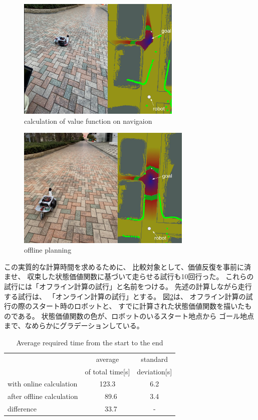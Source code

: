 \documentclass{jarticle}
\begin{document}
\begin{figure}[htb]
  \centering
   \includegraphics[height=58mm]{./figs/raspicat-online.png}
   \caption{calculation of value function on navigaion}
	\label{fig:raspicat-no-local}
\end{figure}

\begin{figure}[b]
  \centering
   \includegraphics[height=58mm]{./figs/raspicat-offline.png}
   \caption{offline planning}
	\label{fig:raspicat-after-planning}
\end{figure}


この実質的な計算時間を求めるために、
比較対象として、価値反復を事前に済ませ、
収束した状態価値関数に基づいて走らせる試行も10回行った。
これらの試行には「オフライン計算の試行」と名前をつける。
先述の計算しながら走行する試行は、
「オンライン計算の試行」とする。
図\ref{fig:raspicat-after-planning}は、
オフライン計算の試行の際のスタート時のロボットと、
すでに計算された状態価値関数を描いたものである。
状態価値関数の色が、ロボットのいるスタート地点から
ゴール地点まで、なめらかにグラデーションしている。


\begin{table}[hbtp]
	\caption{Average required time from the start to the end}
	\label{table:result}
	\centering
	\begin{small}
	 \begin{tabular}{l|cc}
		\hline
		 & average & standard \\
		 & of total time[s] & deviation[s] \\
		\hline \hline
		with online calculation & 123.3 & 6.2 \\
		after offline calculation &\ \ 89.6 & 3.4 \\
		\hline
		 difference & \ \ 33.7 & - \\
		\hline
	 \end{tabular}
	\end{small}
\end{table}
\end{document}
